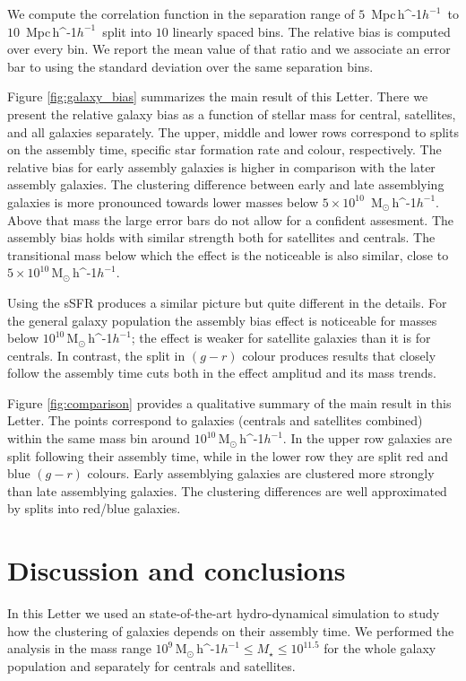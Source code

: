 \documentclass[fleqn,usenatbib]{mnras}
\newcommand{\Msunh}{\,{\rm M}$_{\odot}$\,\ifmmode h^{-1}\else $h^{-1}$\fi}
\newcommand{\Mpch}{\,{\rm Mpc}\,\ifmmode h^{-1}\else $h^{-1}$\fi}
\begin{document}
We compute the correlation function in the separation range of
$5$ \Mpch\ to $10$ \Mpch\ split into $10$ linearly spaced bins. 
The relative bias is computed over every bin.
We report the mean value of that ratio and we associate an error bar
to using the standard deviation over the same separation bins.

Figure \ref{fig:galaxy_bias} summarizes the main result of this Letter.
There we present the relative galaxy bias as a
function of stellar mass for central, satellites, and all galaxies
separately. 
The upper, middle and lower rows correspond to splits on the assembly
time, specific star formation rate and colour, respectively.
The relative bias for early assembly galaxies is higher in comparison
with the later assembly galaxies.
The clustering difference between early and late assemblying galaxies
is more pronounced towards lower masses below $5 \times 10^{10}$
\Msunh.
Above that mass the large error bars do not allow for a confident
assesment. 
The assembly bias holds with similar strength both for satellites and
centrals. 
The transitional mass below which the effect is the noticeable is also
similar, close to $5\times 10^{10}$\Msunh.

Using the sSFR produces a similar picture but quite different in the
details. 
For the general galaxy population the assembly bias effect is
noticeable for masses below $10^{10}$\Msunh; the effect is weaker for
satellite galaxies than it is for centrals. 
In contrast, the split in $(g-r)$ colour produces results that
closely follow the assembly time cuts both in the effect amplitud and
its mass trends.

Figure \ref{fig:comparison} provides a qualitative summary of the main
result in this Letter.
The points correspond to galaxies (centrals and satellites combined) 
within the same mass bin around $10^{10}$\Msunh. 
In the upper row galaxies are split following their assembly time,
while in the lower row they are split red and blue $(g-r)$ colours.
Early assemblying galaxies are clustered more strongly than late
assemblying galaxies. 
The clustering differences are well approximated by splits into
red/blue galaxies. 



\section{Discussion and conclusions}
\label{sec:conclu}

In this Letter we used an state-of-the-art hydro-dynamical simulation
to study how the clustering of galaxies depends on their assembly
time.
We performed the analysis in the mass range $10^{9}$\Msunh $\leq
M_{\star} \leq 10^{11.5}$ for the whole galaxy population and
separately for centrals and satellites.
\end{document}
